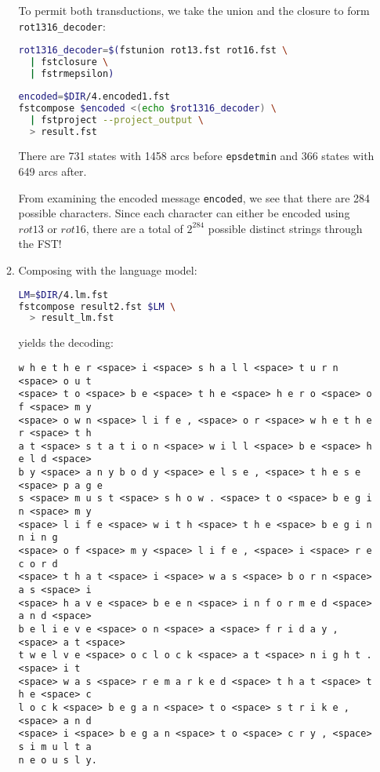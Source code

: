 \documentclass[a4paper,oneside,reqno]{amsart}
\begin{document}
\begin{enumerate}[label=\arabic*.]
\begin{enumerate}[label=(\alph*)]
    To permit both transductions, we take the union and the closure
    to form \texttt{rot1316\_decoder}:
    \begin{lstlisting}[language=bash]
rot1316_decoder=$(fstunion rot13.fst rot16.fst \
  | fstclosure \
  | fstrmepsilon)
    \end{lstlisting}

    \begin{lstlisting}[language=bash]
encoded=$DIR/4.encoded1.fst
fstcompose $encoded <(echo $rot1316_decoder) \
  | fstproject --project_output \
  > result.fst
    \end{lstlisting}
    There are 731 states with 1458 arcs before \texttt{epsdetmin} and
    366 states with 649 arcs after.

    From examining the encoded message \texttt{encoded}, we see that there are
    284 possible characters.  Since each character can either be encoded using
    $rot13$ or $rot16$, there are a total of $2^284$ possible distinct strings
    through the FST!


  \item Composing with the language model:
    \begin{lstlisting}[language=bash]
LM=$DIR/4.lm.fst
fstcompose result2.fst $LM \
  > result_lm.fst
    \end{lstlisting}
    yields the decoding:
    \begin{verbatim}
w h e t h e r <space> i <space> s h a l l <space> t u r n <space> o u t
<space> t o <space> b e <space> t h e <space> h e r o <space> o f <space> m y
<space> o w n <space> l i f e , <space> o r <space> w h e t h e r <space> t h
a t <space> s t a t i o n <space> w i l l <space> b e <space> h e l d <space>
b y <space> a n y b o d y <space> e l s e , <space> t h e s e <space> p a g e
s <space> m u s t <space> s h o w . <space> t o <space> b e g i n <space> m y
<space> l i f e <space> w i t h <space> t h e <space> b e g i n n i n g
<space> o f <space> m y <space> l i f e , <space> i <space> r e c o r d
<space> t h a t <space> i <space> w a s <space> b o r n <space> a s <space> i
<space> h a v e <space> b e e n <space> i n f o r m e d <space> a n d <space>
b e l i e v e <space> o n <space> a <space> f r i d a y , <space> a t <space>
t w e l v e <space> o c l o c k <space> a t <space> n i g h t . <space> i t
<space> w a s <space> r e m a r k e d <space> t h a t <space> t h e <space> c
l o c k <space> b e g a n <space> t o <space> s t r i k e , <space> a n d
<space> i <space> b e g a n <space> t o <space> c r y , <space> s i m u l t a
n e o u s l y.
    \end{verbatim}


\end{enumerate}
\end{enumerate}
\end{document}
